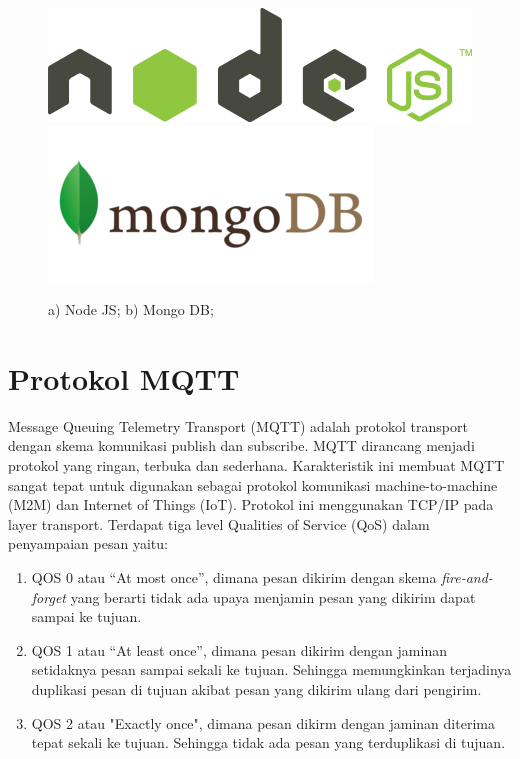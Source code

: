 \begin{figure}[H]
    \centering
	\includegraphics[scale=0.15]{images/nodejs.png}
    \includegraphics[scale=0.3]{images/mongodb.png}
    \caption{a) Node JS; b) Mongo DB;}
\end{figure}

\section{Protokol MQTT}
Message Queuing Telemetry Transport (MQTT) adalah protokol transport
dengan skema komunikasi publish dan subscribe. MQTT dirancang menjadi protokol yang ringan, terbuka dan sederhana. Karakteristik ini membuat MQTT sangat tepat untuk digunakan sebagai protokol komunikasi machine-to-machine (M2M) dan Internet of Things (IoT). Protokol ini menggunakan TCP/IP pada layer transport. Terdapat tiga level Qualities of Service (QoS) dalam penyampaian pesan yaitu:
\begin{enumerate}
	\item QOS 0 atau “At most once”, dimana pesan dikirim dengan skema \textit{fire-and-forget} yang berarti tidak ada upaya menjamin pesan yang dikirim dapat sampai ke tujuan.
	\item QOS 1 atau “At least once”, dimana pesan dikirim dengan jaminan setidaknya pesan sampai sekali ke tujuan. Sehingga memungkinkan terjadinya duplikasi pesan di tujuan akibat pesan yang dikirim ulang dari pengirim.
	\item QOS 2 atau "Exactly once", dimana pesan dikirm dengan jaminan diterima tepat sekali ke tujuan. Sehingga tidak ada pesan yang terduplikasi di tujuan.	
\end{enumerate}

